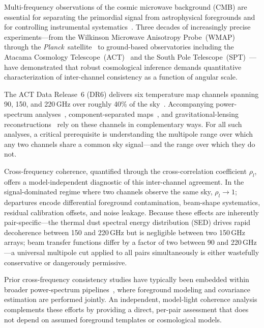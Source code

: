\documentclass[twocolumn,showpacs,preprintnumbers,amsmath,amssymb,floatfix,prd]{revtex4-2}
\def\ell{l}%
\begin{document}
Multi-frequency observations of the cosmic microwave background (CMB) are
essential for separating the primordial signal from astrophysical
foregrounds and for controlling instrumental
systematics~\cite{Tegmark1998,Eriksen2008,Planck2020IV}.  Three decades of
increasingly precise experiments---from the Wilkinson Microwave Anisotropy
Probe~(WMAP)~\cite{Bennett2013} through the
\textit{Planck}\ satellite~\cite{Planck2020VI,Planck2020III} to
ground-based observatories including the Atacama Cosmology
Telescope~(ACT)~\cite{Thornton2016,Aiola2020,Choi2020} and the South Pole
Telescope~(SPT)~\cite{Reichardt2021,Dutcher2021}---have demonstrated that
robust cosmological inference demands quantitative characterization of
inter-channel consistency as a function of angular scale.

The ACT Data Release~6 (DR6) delivers six temperature map channels
spanning 90, 150, and 220\,GHz over roughly 40\% of the
sky~\cite{Naess2025}.  Accompanying power-spectrum
analyses~\cite{Louis2025,Calabrese2025}, component-separated
maps~\cite{Coulton2024}, and gravitational-lensing
reconstructions~\cite{Qu2024,Madhavacheril2024} rely on these channels in
complementary ways.  For all such analyses, a critical prerequisite is
understanding the multipole range over which any two channels share a
common sky signal---and the range over which they do not.

Cross-frequency coherence, quantified through the cross-correlation
coefficient $\rho_\ell$, offers a model-independent diagnostic of this
inter-channel agreement.  In the signal-dominated regime where two channels
observe the same sky, $\rho_\ell\to1$; departures encode differential
foreground contamination, beam-shape systematics, residual calibration
offsets, and noise leakage.  Because these effects are inherently
pair-specific---the thermal dust spectral energy distribution (SED) drives
rapid decoherence between 150 and 220\,GHz but is negligible between two
150\,GHz arrays; beam transfer functions differ by a factor of two between
90 and 220\,GHz---a universal multipole cut applied to all pairs
simultaneously is either wastefully conservative or dangerously permissive.

Prior cross-frequency consistency studies have typically been embedded
within broader power-spectrum
pipelines~\cite{Choi2020,Louis2025,Dutcher2021}, where foreground modeling
and covariance estimation are performed jointly.  An independent,
model-light coherence analysis complements these efforts by providing a
direct, per-pair assessment that does not depend on assumed foreground
templates or cosmological models.
\end{document}
